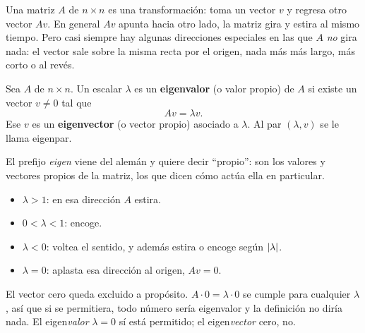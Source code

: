 \documentclass[11pt,letterpaper]{article}
\begin{document}
Una matriz $A$ de $n \times n$ es una transformación: toma un vector
$v$ y regresa otro vector $Av$. En general $Av$ apunta hacia otro
lado, la matriz gira y estira al mismo tiempo. Pero casi siempre hay
algunas direcciones especiales en las que $A$ \emph{no} gira nada:
el vector sale sobre la misma recta por el origen, nada más más largo,
más corto o al revés.

\begin{definicion}
    Sea $A$ de $n \times n$. Un escalar $\lambda$ es un
    \textbf{eigenvalor} (o valor propio) de $A$ si existe un vector
    $v \neq 0$ tal que
    \[
        A v = \lambda v .
    \]
    Ese $v$ es un \textbf{eigenvector} (o vector propio) asociado a
    $\lambda$. Al par $(\lambda, v)$ se le llama eigenpar.
\end{definicion}

El prefijo \emph{eigen} viene del alemán y quiere decir ``propio'':
son los valores y vectores propios de la matriz, los que dicen cómo
actúa ella en particular.

\begin{itemize}[itemsep=0.2em]
    \item $\lambda > 1$: en esa dirección $A$ estira.
    \item $0 < \lambda < 1$: encoge.
    \item $\lambda < 0$: voltea el sentido, y además estira o encoge
          según $\left\lvert \lambda \right\rvert$.
    \item $\lambda = 0$: aplasta esa dirección al origen, $Av = 0$.
\end{itemize}

\begin{ojo}
    El vector cero queda excluido a propósito. $A \cdot 0 = \lambda
    \cdot 0$ se cumple para cualquier $\lambda$, así que si se
    permitiera, todo número sería eigenvalor y la definición no diría
    nada. El eigen\emph{valor} $\lambda = 0$ sí está permitido; el
    eigen\emph{vector} cero, no.
\end{ojo}
\end{document}
